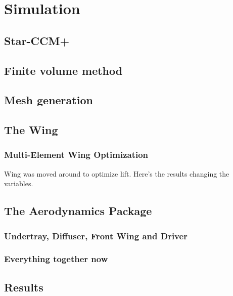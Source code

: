 \chapter{Simulation}

\section{Star-CCM+}

\section{Finite volume method}
\section{Mesh generation}
\section{The Wing}
\subsection{Multi-Element Wing Optimization}
Wing was moved around to optimize lift. Here's the results changing the variables.
\section{The Aerodynamics Package}
\subsection{Undertray, Diffuser, Front Wing and Driver}
\subsection{Everything together now}
\section{Results}
